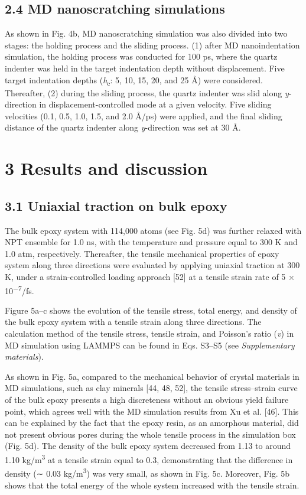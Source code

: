 \documentclass{article}
\begin{document}
\subsection*{2.4 MD nanoscratching simulations}

As shown in Fig. 4b, MD nanoscratching simulation was also divided into two stages: the holding process and the sliding process. (1) after MD nanoindentation simulation, the holding process was conducted for 100 ps, where the quartz indenter was held in the target indentation depth without displacement. Five target indentation depths (\emph{h}\textsubscript{c}: 5, 10, 15, 20, and 25 Å) were considered. Thereafter, (2) during the sliding process, the quartz indenter was slid along \emph{y}-direction in displacement-controlled mode at a given velocity. Five sliding velocities (0.1, 0.5, 1.0, 1.5, and 2.0 Å/ps) were applied, and the final sliding distance of the quartz indenter along \emph{y}-direction was set at 30 Å.

\section*{3 Results and discussion}

\subsection*{3.1 Uniaxial traction on bulk epoxy}

The bulk epoxy system with 114,000 atoms (see Fig. 5d) was further relaxed with NPT ensemble for 1.0 ns, with the temperature and pressure equal to 300 K and 1.0 atm, respectively. Thereafter, the tensile mechanical properties of epoxy system along three directions were evaluated by applying uniaxial traction at 300 K, under a strain-controlled loading approach [52] at a tensile strain rate of 5 × 10\textsuperscript{−7}/fs.

Figure 5a–c shows the evolution of the tensile stress, total energy, and density of the bulk epoxy system with a tensile strain along three directions. The calculation method of the tensile stress, tensile strain, and Poisson’s ratio (\emph{v}) in MD simulation using LAMMPS can be found in Eqs. S3–S5 (see \emph{Supplementary materials}).

As shown in Fig. 5a, compared to the mechanical behavior of crystal materials in MD simulations, such as clay minerals [44, 48, 52], the tensile stress–strain curve of the bulk epoxy presents a high discreteness without an obvious yield failure point, which agrees well with the MD simulation results from Xu et al. [46]. This can be explained by the fact that the epoxy resin, as an amorphous material, did not present obvious pores during the whole tensile process in the simulation box (Fig. 5d). The density of the bulk epoxy system decreased from 1.13 to around 1.10 kg/m\textsuperscript{3} at a tensile strain equal to 0.3, demonstrating that the difference in density (∼ 0.03 kg/m\textsuperscript{3}) was very small, as shown in Fig. 5c. Moreover, Fig. 5b shows that the total energy of the whole system increased with the tensile strain.
\end{document}
